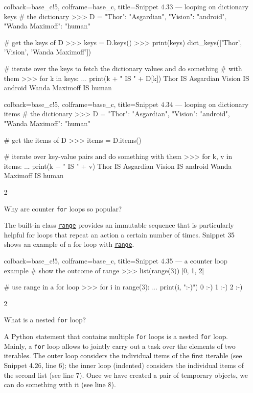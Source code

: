 \documentclass[a4paper,11pt]{book}
\newcommand{\question}[1]{%
    \begin{tcolorbox}[colback=comp_c!10,colframe=comp_c,sidebyside align=top,width=\linewidth,before skip=1ex]
        #1
    \end{tcolorbox}
    \switchcolumn%
}
\newcommand{\note}[1]{%
    \begin{tcolorbox}[colback=white!0,colframe=white!10,width=\linewidth,before skip=1ex]
        #1
    \end{tcolorbox}
}
\begin{document}
\begin{pythoncode}[linenos=true,]{colback=base_c!5, colframe=base_c, title=\sffamily Snippet 4.33 --- looping on dictionary keys}
# the dictionary
>>> D = {"Thor": "Asgardian", "Vision": "android", "Wanda Maximoff": "human"}

# get the keys of D
>>> keys = D.keys()
>>> print(keys)
dict_keys(['Thor', 'Vision', 'Wanda Maximoff'])

# iterate over the keys to fetch the dictionary values and do something 
# with them
>>> for k in keys:
...     print(k + " IS " + D[k])
Thor IS Asgardian
Vision IS android
Wanda Maximoff IS human
\end{pythoncode}

\begin{pythoncode}[linenos=true,]{colback=base_c!5, colframe=base_c, title=\sffamily Snippet 4.34 --- looping on dictionary items}
# the dictionary
>>> D = {"Thor": "Asgardian", "Vision": "android", "Wanda Maximoff": "human"}

# get the items of D
>>> items = D.items()

# iterate over key-value pairs and do something with them
>>> for k, v in items:
...    print(k + " IS " + v)
Thor IS Asgardian
Vision IS android
Wanda Maximoff IS human
\end{pythoncode}
\clearpage

\begin{paracol}{2}
	\question{\raggedright Why are counter \texttt{for} loops so popular?}
	\note{The built-in class \href{https://docs.python.org/3/library/functions.html\#func-range}{\texttt{range}} provides an immutable sequence that is particularly helpful for loops that repeat an action a certain number of times. Snippet 35 shows an example of a for loop with \href{https://docs.python.org/3/library/functions.html\#func-range}{\texttt{range}}.}
\end{paracol}

\begin{pythoncode}[linenos=true,]{colback=base_c!5, colframe=base_c, title=\sffamily Snippet 4.35 --- a counter loop example}
# show the outcome of range
>>> list(range(3))
[0, 1, 2]

# use range in a for loop
>>> for i in range(3):
...     print(i, ":-)")
0 :-)
1 :-)
2 :-)
\end{pythoncode}

\begin{paracol}{2}
	\question{\raggedright What is a nested \texttt{for} loop?}
    \note{A Python statement that contains multiple \texttt{for} loops is a nested \texttt{for} loop. Mainly, a
    \texttt{for} loop allows to jointly carry out a task over the elements of two iterables. The outer loop considers the individual items of the first iterable (see Snippet 4.26, line 6); the inner loop (indented) considers the individual items of the second list (see line 7). Once we have created a pair of temporary objects, we can do something with it (see line 8).}
\end{paracol}
\end{document}

